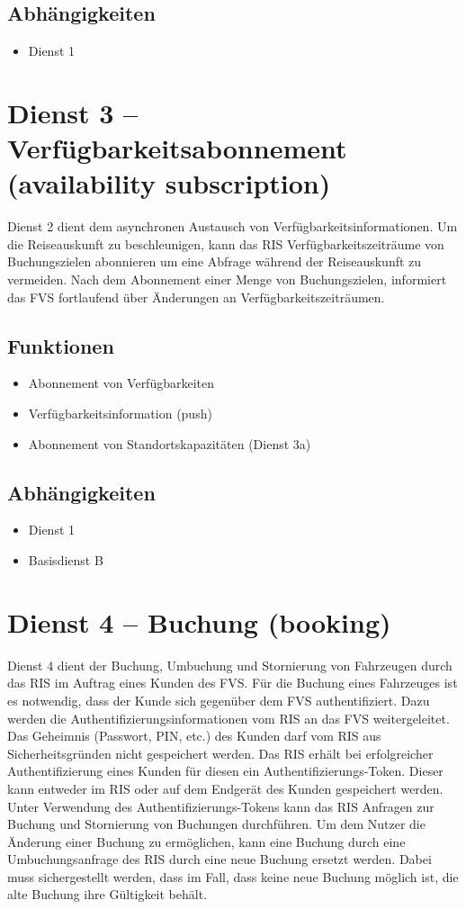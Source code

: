 \subsection*{Abhängigkeiten}
\begin{itemize}
\item Dienst 1
\end{itemize}

\section{Dienst 3 -- Verfügbarkeitsabonnement (availability subscription) }
\label{sec:Hierachiemodell:Dienst3}
Dienst 2 dient dem asynchronen Austausch von Verfügbarkeitsinformationen. Um die Reiseauskunft zu beschleunigen, kann das RIS Verfügbarkeitszeiträume von Buchungszielen abonnieren um eine Abfrage während der Reiseauskunft zu vermeiden. Nach dem Abonnement einer Menge von Buchungszielen, informiert das FVS fortlaufend über Änderungen an Verfügbarkeitszeiträumen.

\subsection*{Funktionen}
\begin{itemize}
\item Abonnement von Verfügbarkeiten
\item Verfügbarkeitsinformation (push)
\item Abonnement von Standortskapazitäten (Dienst 3a)
\end{itemize}

\subsection*{Abhängigkeiten}
\begin{itemize}
\item Dienst 1
\item Basisdienst B
\end{itemize}


\section{Dienst 4 -- Buchung (booking)}
\label{sec:Hierachiemodell:Dienst4}
Dienst 4 dient der Buchung, Umbuchung und Stornierung von Fahrzeugen durch das RIS im Auftrag eines Kunden des FVS. Für die Buchung eines Fahrzeuges ist es notwendig, dass der Kunde sich gegenüber dem FVS authentifiziert. Dazu werden die Authentifizierungsinformationen vom RIS an das FVS weitergeleitet. Das Geheimnis (Passwort, PIN, etc.) des Kunden darf vom RIS aus Sicherheitsgründen nicht gespeichert werden. Das RIS erhält bei erfolgreicher Authentifizierung eines Kunden für diesen ein Authentifizierungs-Token. Dieser kann entweder im RIS oder auf dem Endgerät des Kunden gespeichert werden. Unter Verwendung des Authentifizierungs-Tokens kann das RIS Anfragen zur Buchung und Stornierung von Buchungen durchführen.  Um dem Nutzer die Änderung einer Buchung zu ermöglichen, kann eine Buchung durch eine Umbuchungsanfrage des RIS durch eine neue Buchung ersetzt werden. Dabei muss sichergestellt werden, dass im Fall, dass keine neue Buchung möglich ist, die alte Buchung ihre Gültigkeit behält.

